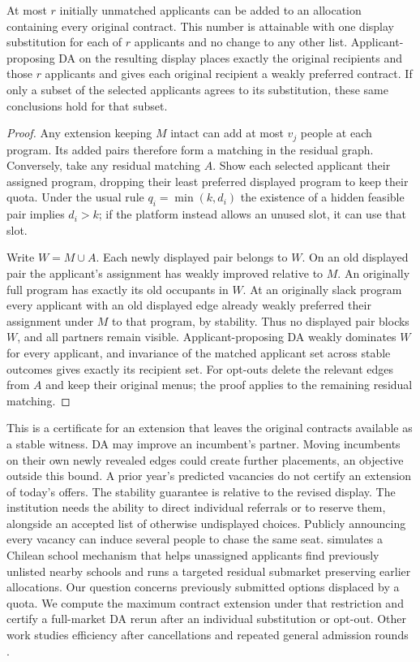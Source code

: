 \begin{theorem}\label{thm:residualreferral}
At most $r$ initially unmatched applicants can be added to an allocation containing every original contract. This number is attainable with one display substitution for each of $r$ applicants and no change to any other list. Applicant-proposing DA on the resulting display places exactly the original recipients and those $r$ applicants and gives each original recipient a weakly preferred contract. If only a subset of the selected applicants agrees to its substitution, these same conclusions hold for that subset.
\end{theorem}
\begin{proof}
Any extension keeping $M$ intact can add at most $v_j$ people at each program. Its added pairs therefore form a matching in the residual graph. Conversely, take any residual matching $A$. Show each selected applicant their assigned program, dropping their least preferred displayed program to keep their quota. Under the usual rule $q_i=\min(k,d_i)$ the existence of a hidden feasible pair implies $d_i>k$; if the platform instead allows an unused slot, it can use that slot.

Write $W=M\cup A$. Each newly displayed pair belongs to $W$. On an old displayed pair the applicant's assignment has weakly improved relative to $M$. An originally full program has exactly its old occupants in $W$. At an originally slack program every applicant with an old displayed edge already weakly preferred their assignment under $M$ to that program, by stability. Thus no displayed pair blocks $W$, and all partners remain visible. Applicant-proposing DA weakly dominates $W$ for every applicant, and invariance of the matched applicant set across stable outcomes gives exactly its recipient set. For opt-outs delete the relevant edges from $A$ and keep their original menus; the proof applies to the remaining residual matching.
\end{proof}

This is a certificate for an extension that leaves the original contracts available as a stable witness. DA may improve an incumbent's partner. Moving incumbents on their own newly revealed edges could create further placements, an objective outside this bound. A prior year's predicted vacancies do not certify an extension of today's offers. The stability guarantee is relative to the revised display. The institution needs the ability to direct individual referrals or to reserve them, alongside an accepted list of otherwise undisplayed choices. Publicly announcing every vacancy can induce several people to chase the same seat. \citet{lepesure} simulates a Chilean school mechanism that helps unassigned applicants find previously unlisted nearby schools and runs a targeted residual submarket preserving earlier allocations. Our question concerns previously submitted options displaced by a quota. We compute the maximum contract extension under that restriction and certify a full-market DA rerun after an individual substitution or opt-out. Other work studies efficiency after cancellations and repeated general admission rounds \citep{feigenbaumreallocation,gradualschool}.

